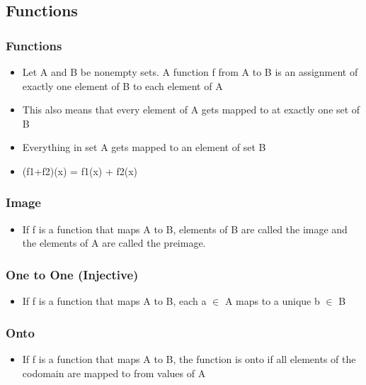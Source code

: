 \documentclass[11pt]{article}
\begin{document}
\subsection{Functions}
\label{sec-2-3}
\subsubsection{Functions}
\label{sec-2-3-1}
\begin{itemize}

\item Let A and B be nonempty sets. A function f from A to B is an assignment of exactly one element of B to each element of A
\label{sec-2-3-1-1}%

\item This also means that every element of A gets mapped to at exactly one set of B
\label{sec-2-3-1-2}%

\item Everything in set A gets mapped to an element of set B
\label{sec-2-3-1-3}%

\item (f1+f2)(x) = f1(x) + f2(x)
\label{sec-2-3-1-4}%
\end{itemize} %
\subsubsection{Image}
\label{sec-2-3-2}
\begin{itemize}

\item If f is a function that maps A to B, elements of B are called the image and the elements of A are called the preimage.
\label{sec-2-3-2-1}%
\end{itemize} %
\subsubsection{One to One (Injective)}
\label{sec-2-3-3}
\begin{itemize}

\item If f is a function that maps A to B, each a $\in$ A maps to a unique b $\in$ B
\label{sec-2-3-3-1}%
\end{itemize} %
\subsubsection{Onto}
\label{sec-2-3-4}
\begin{itemize}

\item If f is a function that maps A to B, the function is onto if all elements of the codomain are mapped to from values of A
\label{sec-2-3-4-1}%
\end{itemize} %
\end{document}
